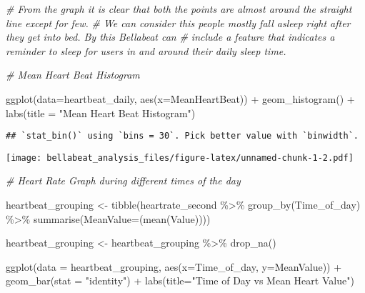 \documentclass[
]{article}
\newenvironment{Shaded}{\begin{snugshade}}{\end{snugshade}}
\newcommand{\AttributeTok}[1]{\textcolor[rgb]{0.77,0.63,0.00}{#1}}
\newcommand{\CommentTok}[1]{\textcolor[rgb]{0.56,0.35,0.01}{\textit{#1}}}
\newcommand{\FunctionTok}[1]{\textcolor[rgb]{0.00,0.00,0.00}{#1}}
\newcommand{\NormalTok}[1]{#1}
\newcommand{\OtherTok}[1]{\textcolor[rgb]{0.56,0.35,0.01}{#1}}
\newcommand{\SpecialCharTok}[1]{\textcolor[rgb]{0.00,0.00,0.00}{#1}}
\newcommand{\StringTok}[1]{\textcolor[rgb]{0.31,0.60,0.02}{#1}}
\begin{document}
\begin{Shaded}
\begin{Highlighting}[]
\CommentTok{\# From the graph it is clear that both the points are almost around the straight line except for few.}
\CommentTok{\# We can consider this people mostly fall asleep right after they get into bed. By this Bellabeat can}
\CommentTok{\# include a feature that indicates a reminder to sleep for users in and around their daily sleep time. }

\CommentTok{\# Mean Heart Beat Histogram}

\FunctionTok{ggplot}\NormalTok{(}\AttributeTok{data=}\NormalTok{heartbeat\_daily, }\FunctionTok{aes}\NormalTok{(}\AttributeTok{x=}\NormalTok{MeanHeartBeat)) }\SpecialCharTok{+}
  \FunctionTok{geom\_histogram}\NormalTok{() }\SpecialCharTok{+} 
  \FunctionTok{labs}\NormalTok{(}\AttributeTok{title =} \StringTok{"Mean Heart Beat Histogram"}\NormalTok{)}
\end{Highlighting}
\end{Shaded}

\begin{verbatim}
## `stat_bin()` using `bins = 30`. Pick better value with `binwidth`.
\end{verbatim}

\texttt{[image: bellabeat\_analysis\_files/figure-latex/unnamed-chunk-1-2.pdf]}

\begin{Shaded}
\begin{Highlighting}[]
\CommentTok{\# Heart Rate Graph during different times of the day}

\NormalTok{heartbeat\_grouping }\OtherTok{\textless{}{-}} 
  \FunctionTok{tibble}\NormalTok{(heartrate\_second }\SpecialCharTok{\%\textgreater{}\%}
           \FunctionTok{group\_by}\NormalTok{(Time\_of\_day) }\SpecialCharTok{\%\textgreater{}\%}
           \FunctionTok{summarise}\NormalTok{(}\AttributeTok{MeanValue=}\NormalTok{(}\FunctionTok{mean}\NormalTok{(Value))))}

\NormalTok{heartbeat\_grouping }\OtherTok{\textless{}{-}}\NormalTok{ heartbeat\_grouping }\SpecialCharTok{\%\textgreater{}\%} \FunctionTok{drop\_na}\NormalTok{()}

\FunctionTok{ggplot}\NormalTok{(}\AttributeTok{data =}\NormalTok{ heartbeat\_grouping, }\FunctionTok{aes}\NormalTok{(}\AttributeTok{x=}\NormalTok{Time\_of\_day, }\AttributeTok{y=}\NormalTok{MeanValue)) }\SpecialCharTok{+} 
  \FunctionTok{geom\_bar}\NormalTok{(}\AttributeTok{stat =} \StringTok{"identity"}\NormalTok{) }\SpecialCharTok{+} 
  \FunctionTok{labs}\NormalTok{(}\AttributeTok{title=}\StringTok{"Time of Day vs Mean Heart Value"}\NormalTok{)}
\end{Highlighting}
\end{Shaded}
\end{document}
